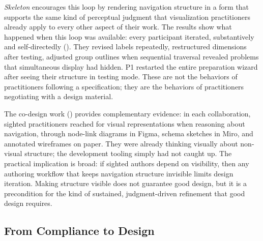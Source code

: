 \documentclass[12pt]{cmuthesis}
\begin{document}
\textit{Skeleton} encourages this loop by rendering navigation structure in a form that supports the same kind of perceptual judgment that visualization practitioners already apply to every other aspect of their work. The results show what happened when this loop was available: every participant iterated, substantively and self-directedly (). They revised labels repeatedly, restructured dimensions after testing, adjusted group outlines when sequential traversal revealed problems that simultaneous display had hidden. P1 restarted the entire preparation wizard after seeing their structure in testing mode. These are not the behaviors of practitioners following a specification; they are the behaviors of practitioners negotiating with a design material.

The co-design work () provides complementary evidence: in each collaboration, sighted practitioners reached for visual representations when reasoning about navigation, through node-link diagrams in Figma, schema sketches in Miro, and annotated wireframes on paper. They were already thinking visually about non-visual structure; the development tooling simply had not caught up. The practical implication is broad: if sighted authors depend on visibility, then any authoring workflow that keeps navigation structure invisible limits design iteration. Making structure visible does not guarantee good design, but it is a precondition for the kind of sustained, judgment-driven refinement that good design requires.


\subsection{From Compliance to Design}

\end{document}
